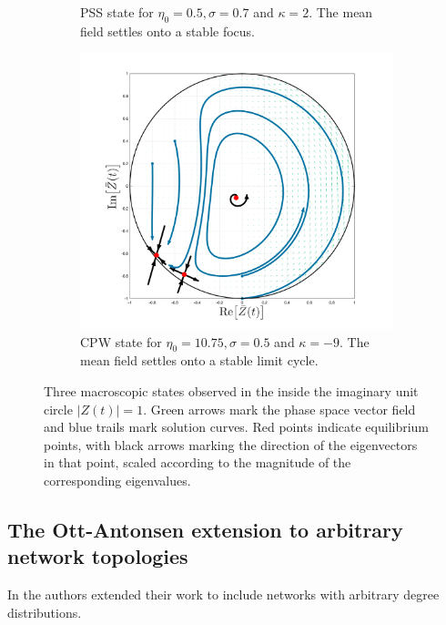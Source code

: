 \begin{figure}[H]
\begin{subfigure}[b]{0.32\linewidth}
   \caption{PSS state for $\eta_0 = 0.5, \sigma = 0.7$ and $\kappa= 2$. The mean field settles onto a stable focus.}
   \label{fig:MFRPSS}
\end{subfigure} \hfill
\begin{subfigure}[b]{0.32\linewidth}
   \centering
  \includegraphics[width=\linewidth, trim={2cm 1cm 2cm 1.5cm },clip]{../Figures/PhaseSpace/MFRCPW.png}
   \caption{CPW state for $\eta_0 = 10.75, \sigma = 0.5$ and $\kappa= -9$. The mean field settles onto a stable limit cycle.}
   \label{fig:MFRCPW}
\end{subfigure}
   \caption{Three macroscopic states observed in the \MFR inside the imaginary unit circle $|Z(t)| = 1$. Green arrows mark the phase space vector field and blue trails mark solution curves. Red points indicate equilibrium points, with black arrows marking the direction of the eigenvectors in that point, scaled according to the magnitude of the corresponding eigenvalues.}
   \label{fig:macroscopicstatesfixeddegree}
\end{figure}



\subsection{The Ott-Antonsen extension to arbitrary network topologies}
In \cite{OttAntonsen2017} the authors extended their work to include networks with arbitrary degree distributions.

